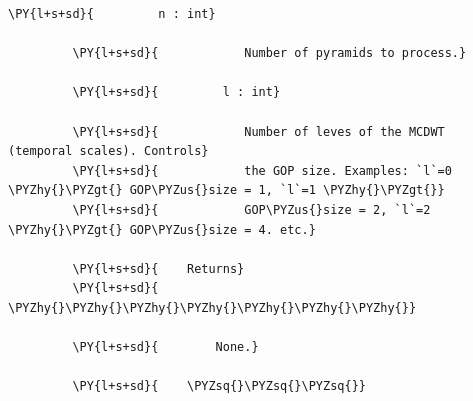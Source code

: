 {\begin{Verbatim}[commandchars=\\\{\}]
         \PY{l+s+sd}{         n : int}
         
         \PY{l+s+sd}{            Number of pyramids to process.}
         
         \PY{l+s+sd}{         l : int}
         
         \PY{l+s+sd}{            Number of leves of the MCDWT (temporal scales). Controls}
         \PY{l+s+sd}{            the GOP size. Examples: `l`=0 \PYZhy{}\PYZgt{} GOP\PYZus{}size = 1, `l`=1 \PYZhy{}\PYZgt{}}
         \PY{l+s+sd}{            GOP\PYZus{}size = 2, `l`=2 \PYZhy{}\PYZgt{} GOP\PYZus{}size = 4. etc.}
         
         \PY{l+s+sd}{    Returns}
         \PY{l+s+sd}{    \PYZhy{}\PYZhy{}\PYZhy{}\PYZhy{}\PYZhy{}\PYZhy{}\PYZhy{}}
         
         \PY{l+s+sd}{        None.}
         
         \PY{l+s+sd}{    \PYZsq{}\PYZsq{}\PYZsq{}}
             

\end{Verbatim}}
